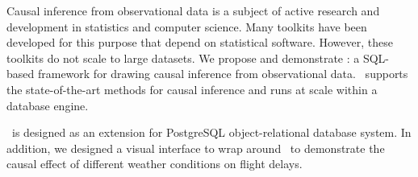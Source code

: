 Causal inference from observational data is a subject of active research and development in statistics and computer science. Many toolkits have been developed for this purpose that depend on statistical software.
However, these toolkits do not scale to large datasets.
We propose and demonstrate \GSQL: a SQL-based framework for drawing causal inference from observational data.
\GSQL\ supports the state-of-the-art methods for causal inference and runs at scale within a database engine.
 \GSQL\ is designed as an extension for PostgreSQL object-relational database system. In addition, we designed a visual interface to wrap around \GSQL\  to demonstrate the causal effect of different weather conditions on flight delays. 